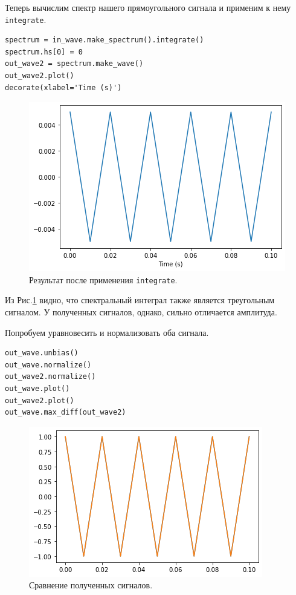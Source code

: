 \documentclass[a4paper, 14pt]{extarticle}
\begin{document}
    Теперь вычислим спектр нашего прямоугольного сигнала и применим к нему \texttt{integrate}.

    \begin{lstlisting}[caption= Применение \texttt{integrate}., label={lst:task3_out_integrate}]
spectrum = in_wave.make_spectrum().integrate()
spectrum.hs[0] = 0
out_wave2 = spectrum.make_wave()
out_wave2.plot()
decorate(xlabel='Time (s)')     \end{lstlisting}

    \begin{figure}[h]
        \centering
        \includegraphics[width=0.7\linewidth]{resources/Images/task3_out_integrate}
        \caption{Результат после применения \texttt{integrate}.}
        \label{fig:task3_out_integrate}
    \end{figure}

    Из Рис.\ref{fig:task3_out_integrate} видно, что спектральный интеграл также является треугольным сигналом.
    У полученных сигналов, однако, сильно отличается амплитуда.

    Попробуем уравновесить и нормализовать оба сигнала.

    \begin{lstlisting}[caption= Работа с сигналами., label={lst:task3_normalize_result}]
out_wave.unbias()
out_wave.normalize()
out_wave2.normalize()
out_wave.plot()
out_wave2.plot()
out_wave.max_diff(out_wave2)    \end{lstlisting}

    \begin{figure}[h]
        \centering
        \includegraphics[width=0.8\linewidth]{resources/Images/task3_normalize_result}
        \caption{Сравнение полученных сигналов.}
        \label{fig:task3_normalize_result}
    \end{figure}
\end{document}
